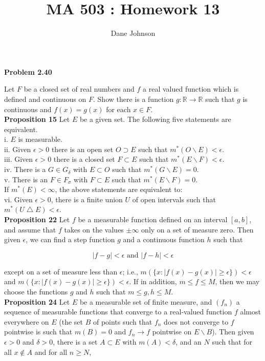 \documentclass[a4paper]{article}
\title{MA 503 : Homework 13}
\author{Dane Johnson}
\begin{document}
\maketitle

{\bf Problem 2.40}

Let $F$ be a closed set of real numbers and $f$ a real valued function which is defined and continuous on $F$. Show there is a function $g : \mathbb{R}\rightarrow \mathbb{R}$ such that $g$ is continuous and $f(x) = g(x)$ for each $x \in F$. \\

{\bf Proposition 15} Let $E$ be a given set. The following five statements are equivalent.\\

i. $E$ is measurable.\\
ii. Given $\epsilon > 0$ there is an open set $O \supset E$ such that $m^*(O \backslash E) < \epsilon$. \\
iii. Given $\epsilon > 0$ there is a closed set $F \subset E$ such that $m^*(E \backslash F) < \epsilon$.\\
iv. There is a $G \in G_{\delta}$ with $E \subset O$ such that $m^*(G \backslash E) = 0$.\\
v. There is an $F \in F_\sigma$ with $F \subset E$ such that $m^*(E \backslash F) = 0$. \\

If $m^*(E) < \infty$, the above statements are equivalent to:\\

vi. Given $\epsilon > 0$, there is a finite union $U$ of open intervals such that $m^*(U \bigtriangleup E) < \epsilon$.\\

{\bf Proposition 22} Let $f$ be a measurable function defined on an interval $[a,b]$, and assume that $f$ takes on the values $\pm \infty$ only on a set of measure zero. Then given $\epsilon$, we can find a step function $g$ and a continuous function $h$ such that

$$|f-g| < \epsilon \text{ and } |f-h| < \epsilon $$

except on a set of measure less than $\epsilon$; i.e., $m(\{x : |f(x) - g(x)| \geq \epsilon \}) < \epsilon$ and $m(\{x : |f(x) - g(x)| \geq \epsilon \}) < \epsilon$. If in addition, $m \leq f \leq M$, then we may choose the functions $g$ and $h$ such that $m \leq g,h \leq M$. \\

{\bf Proposition 24} Let $E$ be a measurable set of finite measure, and $(f_n)$ a sequence of measurable functions that converge to a real-valued function $f$ almost everywhere on $E$ (the set $B$ of points such that $f_n$ does not converge to $f$ pointwise is such that $m(B) = 0$ and $f_n \rightarrow f$ pointwise on $E \backslash B$). Then given $\epsilon > 0$ and $\delta > 0$, there is a set $A \subset E$ with $m(A) < \delta$, and an $N$ such that for all $x\not\in A$ and for all $n\geq N$, 
\end{document}
